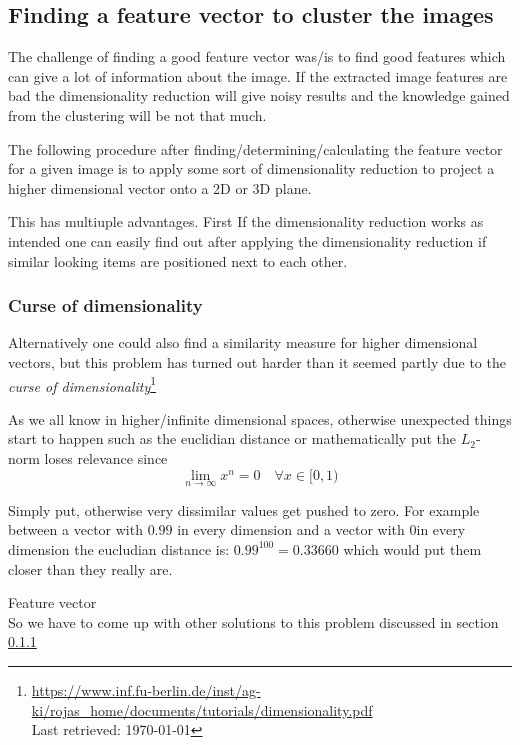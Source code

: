 \documentclass[journal]{vgtc}       %
\begin{document}
\subsection{Finding a feature vector to cluster the images}\label{sec:featurev}

The challenge of finding a good feature vector was/is to find good features which can give a lot of information about the image.
If the extracted image features are bad the dimensionality reduction will give noisy results and the knowledge gained from the clustering will be not that much.

The following procedure after finding/determining/calculating the feature vector for a given image is to apply some sort of dimensionality reduction to project a higher dimensional vector onto a 2D or 3D plane.

This has multiuple advantages. First If the dimensionality reduction works as intended one can easily find out after applying the dimensionality reduction if similar looking items are positioned next to each other.

\subsubsection{Curse of dimensionality}
Alternatively one could also find a similarity measure for higher dimensional vectors, but this problem has turned out harder than it seemed partly due to the \textit{curse of dimensionality}\footnote{\url{https://www.inf.fu-berlin.de/inst/ag-ki/rojas_home/documents/tutorials/dimensionality.pdf}\\ Last retrieved: \today}


As we all know in higher/infinite dimensional spaces, otherwise unexpected things start to happen such as the euclidian distance or mathematically put the \(L_2\)-norm loses relevance since
\begin{equation}
\lim_{n\rightarrow \infty} x^n = 0 \quad \forall x \in [0,1)
\end{equation}

Simply put, otherwise very dissimilar values get pushed to zero. For example between a vector with \(0.99\) in every dimension and a vector with \(0\)in every dimension the eucludian distance is: \(0.99^{100} = 0.33660\) which would put them closer than they really are.

Feature vector \\
So we have to come up with other solutions to this problem discussed in section \ref{}
\end{document}
